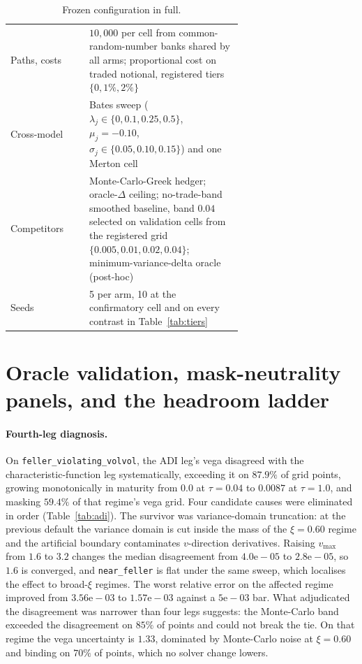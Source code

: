 \documentclass[10pt]{article}
\begin{document}
\begin{table}[h]
\begin{tabular}{@{}lp{0.66\linewidth}@{}}
Paths, costs & $10{,}000$ per cell from common-random-number banks shared by all arms; proportional cost on traded notional, registered tiers $\{0, 1\%, 2\%\}$ \\
Cross-model & Bates sweep ($\lambda_j\in\{0,0.1,0.25,0.5\}$, $\mu_j{=}-0.10$, $\sigma_j\in\{0.05,0.10,0.15\}$) and one Merton cell \\
Competitors & Monte-Carlo-Greek hedger; oracle-$\Delta$ ceiling; no-trade-band smoothed baseline, band $0.04$ selected on validation cells from the registered grid $\{0.005,0.01,0.02,0.04\}$; minimum-variance-delta oracle (post-hoc) \\
Seeds & 5 per arm, 10 at the confirmatory cell and on every contrast in Table~\ref{tab:tiers} \\
\bottomrule
\end{tabular}
\caption{Frozen configuration in full.}
\label{tab:configfull}
\end{table}

\section{Oracle validation, mask-neutrality panels, and the headroom ladder}
\label{app:oracle}

\paragraph{Fourth-leg diagnosis.} On \texttt{feller\_violating\_volvol}, the ADI
leg's vega disagreed with the characteristic-function leg systematically, exceeding
it on $87.9\%$ of grid points, growing monotonically in maturity from $0.0$ at
$\tau = 0.04$ to $0.0087$ at $\tau = 1.0$, and masking $59.4\%$ of that regime's vega
grid. Four candidate causes were eliminated in order (Table~\ref{tab:adi}). The
survivor was variance-domain truncation: at the previous default the variance domain
is cut inside the mass of the $\xi = 0.60$ regime and the artificial boundary
contaminates $v$-direction derivatives. Raising $v_{\max}$ from $1.6$ to $3.2$
changes the median disagreement from $4.0\mathrm{e}{-}05$ to $2.8\mathrm{e}{-}05$,
so $1.6$ is converged, and \texttt{near\_feller} is flat under the same sweep, which
localises the effect to broad-$\xi$ regimes. The worst relative error on the affected
regime improved from $3.56\mathrm{e}{-}03$ to $1.57\mathrm{e}{-}03$ against a
$5\mathrm{e}{-}03$ bar. What adjudicated the disagreement was narrower than four legs
suggests: the Monte-Carlo band exceeded the disagreement on $85\%$ of points and
could not break the tie. On that regime the vega uncertainty is $1.33$, dominated by
Monte-Carlo noise at $\xi = 0.60$ and binding on $70\%$ of points, which no solver
change lowers.
\end{document}

